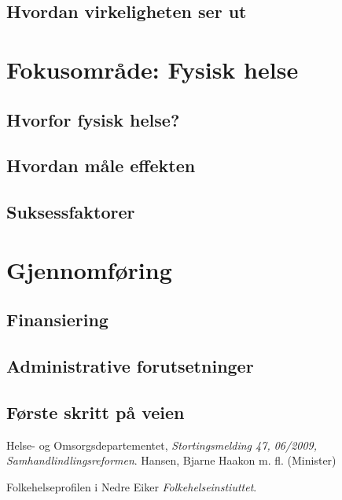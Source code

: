 \documentclass[11pt]{memoir} %
\begin{document}
	\section{Hvordan virkeligheten ser ut}

\chapter{Fokusområde: Fysisk helse}
	\section{Hvorfor fysisk helse?}
	\section{Hvordan måle effekten}
	\section{Suksessfaktorer}


\chapter{Gjennomføring}
	\section{Finansiering}
	\section{Administrative forutsetninger}
	\section{Første skritt på veien}

 \renewcommand{\bibname}{Kilder:}
              \begin{thebibliography}{99}

                  Helse- og Omsorgsdepartementet,
                  \emph{Stortingsmelding 47, 06/2009, Samhandlindlingsreformen}.
                  Hansen, Bjarne Haakon m. fl. (Minister)

                  Folkehelseprofilen i Nedre Eiker
                  \emph{Folkehelseinstiuttet}.
                  

\end{thebibliography}
\end{document}

